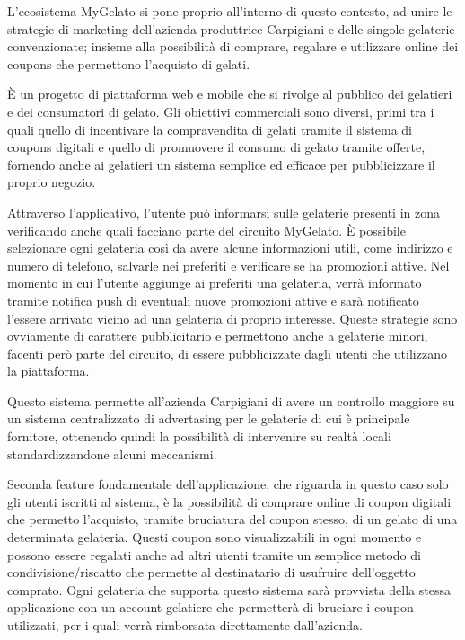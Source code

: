 L'ecosistema MyGelato si pone proprio all'interno di questo contesto, ad unire le strategie di marketing dell'azienda produttrice Carpigiani e delle singole gelaterie convenzionate; insieme alla possibilità di comprare, regalare e utilizzare online dei coupons che permettono l'acquisto di gelati.

È un progetto di piattaforma web e mobile che si rivolge al pubblico dei gelatieri e dei consumatori di gelato. Gli obiettivi commerciali sono diversi, primi tra i quali quello di incentivare la compravendita di gelati tramite il sistema di coupons digitali e quello di promuovere il consumo di gelato tramite offerte, fornendo anche ai gelatieri un sistema semplice ed efficace per pubblicizzare il proprio negozio.

Attraverso l'applicativo, l'utente può informarsi sulle gelaterie presenti in zona verificando anche quali facciano parte del circuito MyGelato.
È possibile selezionare ogni gelateria così da avere alcune informazioni utili, come indirizzo e numero di telefono, salvarle nei preferiti e verificare se ha promozioni attive.
Nel momento in cui l'utente aggiunge ai preferiti una gelateria, verrà informato tramite notifica push di eventuali nuove promozioni attive e sarà notificato l'essere arrivato vicino ad una gelateria di proprio interesse.
Queste strategie sono ovviamente di carattere pubblicitario e permettono anche a gelaterie minori, facenti però parte del circuito, di essere pubblicizzate dagli utenti che utilizzano la piattaforma.

Questo sistema permette all'azienda Carpigiani di avere un controllo maggiore su un sistema centralizzato di advertasing per le gelaterie di cui è principale fornitore, ottenendo quindi la possibilità di intervenire su realtà locali standardizzandone alcuni meccanismi.

Seconda feature fondamentale dell'applicazione, che riguarda in questo caso solo gli utenti iscritti al sistema, è la possibilità di comprare online di coupon digitali che permetto l'acquisto, tramite bruciatura del coupon stesso, di un gelato di una determinata gelateria.
Questi coupon sono visualizzabili in ogni momento e possono essere regalati anche ad altri utenti tramite un semplice metodo di condivisione/riscatto che permette al destinatario di usufruire dell'oggetto comprato.
Ogni gelateria che supporta questo sistema sarà provvista della stessa applicazione con un account gelatiere che permetterà di bruciare i coupon utilizzati, per i quali verrà rimborsata direttamente dall'azienda.

